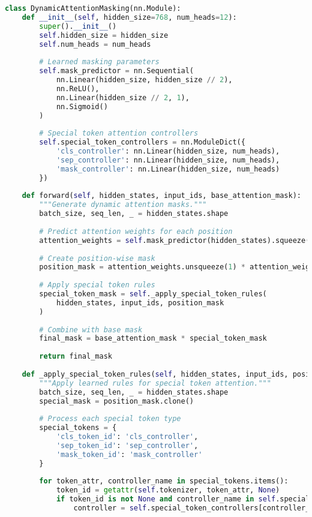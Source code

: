 \begin{lstlisting}[language=Python, caption=Dynamic attention masking based on content]
class DynamicAttentionMasking(nn.Module):
    def __init__(self, hidden_size=768, num_heads=12):
        super().__init__()
        self.hidden_size = hidden_size
        self.num_heads = num_heads
        
        # Learned masking parameters
        self.mask_predictor = nn.Sequential(
            nn.Linear(hidden_size, hidden_size // 2),
            nn.ReLU(),
            nn.Linear(hidden_size // 2, 1),
            nn.Sigmoid()
        )
        
        # Special token attention controllers
        self.special_token_controllers = nn.ModuleDict({
            'cls_controller': nn.Linear(hidden_size, num_heads),
            'sep_controller': nn.Linear(hidden_size, num_heads),
            'mask_controller': nn.Linear(hidden_size, num_heads)
        })
        
    def forward(self, hidden_states, input_ids, base_attention_mask):
        """Generate dynamic attention masks."""
        batch_size, seq_len, _ = hidden_states.shape
        
        # Predict attention weights for each position
        attention_weights = self.mask_predictor(hidden_states).squeeze(-1)
        
        # Create position-wise mask
        position_mask = attention_weights.unsqueeze(1) * attention_weights.unsqueeze(2)
        
        # Apply special token rules
        special_token_mask = self._apply_special_token_rules(
            hidden_states, input_ids, position_mask
        )
        
        # Combine with base mask
        final_mask = base_attention_mask * special_token_mask
        
        return final_mask
        
    def _apply_special_token_rules(self, hidden_states, input_ids, position_mask):
        """Apply learned rules for special token attention."""
        batch_size, seq_len, _ = hidden_states.shape
        special_mask = position_mask.clone()
        
        # Process each special token type
        special_tokens = {
            'cls_token_id': 'cls_controller',
            'sep_token_id': 'sep_controller', 
            'mask_token_id': 'mask_controller'
        }
        
        for token_attr, controller_name in special_tokens.items():
            token_id = getattr(self.tokenizer, token_attr, None)
            if token_id is not None and controller_name in self.special_token_controllers:
                controller = self.special_token_controllers[controller_name]
                

\end{lstlisting}
